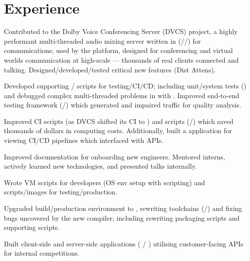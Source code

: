 \documentclass[a4paper]{oscar-resume}
\begin{document}
\hfill
%
%
\begin{minipage}[t]{0.66\textwidth} %
    \section{Experience}
    \smallsectionspace{}

        \vspace{\topsep} %
    \begin{tightitemize}
        \item {Contributed to the Dolby Voice Conferencing Server (DVCS) project, a highly performant multi-threaded audio mixing server written in \cpp{} (\cppstd{}/\conan{}/\cmake{}) for \voip{} communications;
            used by the \dolbyio{} platform, designed for conferencing and virtual worlds communication at high-scale --- thousands of real clients connected and talking.
           Designed/developed/tested critical new features (Dist Attens). }
        \item {Developed supporting \python{}/\bash{} scripts for testing/CI/CD; including unit/system tests (\googletest{}) and debugged complex multi-threaded problems in \cpp{} with \gdb{}.
        Improved \oats{} end-to-end testing framework (\python{}/\asyncio{}) which generated \rtp{} and impaired traffic for quality analysis. }
    \item { Improved CI scripts (as DVCS shifted its CI to \gitlab) and \aws{} scripts (\python/\boto) which saved thousands of dollars in \ectwo{} computing costs. Additionally, built a \nodejs{} \typescript{} application for viewing CI/CD pipelines which interfaced with \gitlab{} \rest{} APIs. }
        \item {Improved documentation for onboarding new engineers. Mentored interns, actively learned new technologies, and presented talks internally.}
        \item {Wrote \vagrant{} VM scripts for developers (OS env setup with \bash{} scripting) and \docker{} scripts/images for testing/production. }
        \item {Upgraded build/production environment to \debian{}, rewriting toolchains (\conan{}/\cmake{}) and fixing bugs uncovered by the new compiler; including rewriting packaging scripts and supporting \python scripts.}
        \item {Built client-side and server-side applications (\nodejs{} \typescript{}/ \javascript{}) utilising customer-facing APIs for internal competitions.}
    \end{tightitemize}
    \smallsectionspace{}


\end{minipage}
\end{document}

